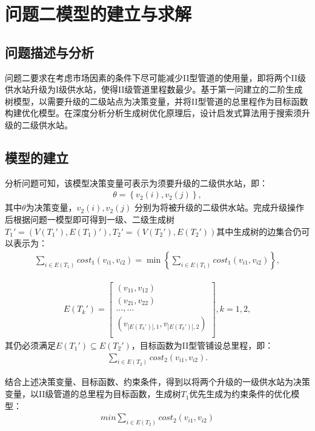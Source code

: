 \documentclass{whutmod}
\begin{document}
	\section{问题二模型的建立与求解}
		\subsection{问题描述与分析}	
			问题二要求在考虑市场因素的条件下尽可能减少II型管道的使用量，即将两个II级供水站升级为I级供水站，使得II级管道里程数最少。基于第一问建立的二阶生成树模型，以需要升级的二级站点为决策变量，并将II型管道的总里程作为目标函数构建优化模型。在深度分析分析生成树优化原理后，设计启发式算法用于搜索须升级的二级供水站。
			\subsection{模型的建立}
			分析问题可知，该模型决策变量可表示为须要升级的二级供水站，即：
				\begin{gather}
				\theta =\left \{ v_2(i),v_2(j) \right \},
				\end{gather}
			其中$\theta$为决策变量，$v_2(i),v_2(j)$ 分别为将被升级的二级供水站。完成升级操作后根据问题一模型即可得到一级、二级生成树$T_{1}'=(V(T_{1}'),E(T_{1})'),T_{2}'=(V(T_{2}'),E(T_{2}'))$其中生成树的边集合仍可以表示为：
			\begin{gather}
			\displaystyle \sum_{i\in E(T_1) }cost_1(v_{i1},v_{i2})=\min\left \{ 	\sum_{i\in E(T_1) }cost_1(v_{i1},v_{i2}) \right \},
			\end{gather}
			
			\begin{gather}
			E(T_k')=
		\begin{bmatrix}
		(v_{11} ,v_{12}) \\ 
		(v_{21} ,v_{22} )\\ 
		...,...\\
		(v_{|E(T_k')|,1},v_{|E(T_k')|,2})\\
		\end{bmatrix},k=1,2,
			\end{gather}
			其仍必须满足$E(T_1')\subseteq E(T_2')$，目标函数为II型管铺设总里程，即：
			\begin{gather}
			\sum_{i\in E(T_2) }cost_2(v_{i1},v_{i2}).
			\end{gather}
			
			结合上述决策变量、目标函数、约束条件，得到以将两个升级的一级供水站为决策变量，以II级管道的总里程为目标函数，生成树$T_1$优先生成为约束条件的优化模型：
			\begin{gather*}
			min  \sum_{i\in E(T_2) }cost_2(v_{i1},v_{i2})
			\end{gather*}
			
\end{document}
